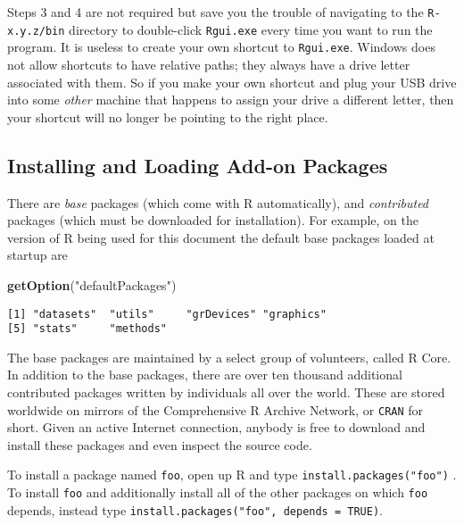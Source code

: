 \documentclass[]{book}
\newenvironment{Shaded}{\begin{snugshade}}{\end{snugshade}}
\newcommand{\KeywordTok}[1]{\textcolor[rgb]{0.13,0.29,0.53}{\textbf{{#1}}}}
\newcommand{\StringTok}[1]{\textcolor[rgb]{0.31,0.60,0.02}{{#1}}}
\newcommand{\NormalTok}[1]{{#1}}
\numberwithin{equation}{chapter}
\numberwithin{figure}{chapter}
\theoremstyle{plain}
\theoremstyle{definition}
\theoremstyle{remark}
\theoremstyle{definition}
\theoremstyle{definition}
\theoremstyle{remark}
\begin{document}
Steps 3 and 4 are not required but save you the trouble of navigating to
the \texttt{R-x.y.z/bin} directory to double-click \texttt{Rgui.exe}
every time you want to run the program. It is useless to create your own
shortcut to \texttt{Rgui.exe}. Windows does not allow shortcuts to have
relative paths; they always have a drive letter associated with them. So
if you make your own shortcut and plug your USB drive into some
\emph{other} machine that happens to assign your drive a different
letter, then your shortcut will no longer be pointing to the right
place.

\subsection{Installing and Loading Add-on
Packages}\label{sub-installing-loading-packages}

There are \emph{base} packages (which come with R automatically), and
\emph{contributed} packages (which must be downloaded for installation).
For example, on the version of R being used for this document the
default base packages loaded at startup are

\begin{Shaded}
\begin{Highlighting}[]
\KeywordTok{getOption}\NormalTok{(}\StringTok{"defaultPackages"}\NormalTok{)}
\end{Highlighting}
\end{Shaded}

\begin{verbatim}
[1] "datasets"  "utils"     "grDevices" "graphics" 
[5] "stats"     "methods"  
\end{verbatim}

The base packages are maintained by a select group of volunteers, called
R Core. In addition to the base packages, there are over ten thousand
additional contributed packages written by individuals all over the
world. These are stored worldwide on mirrors of the Comprehensive R
Archive Network, or \texttt{CRAN} for short. Given an active Internet
connection, anybody is free to download and install these packages and
even inspect the source code.

To install a package named \texttt{foo}, open up R and type
\texttt{install.packages("foo")}
. To install
\texttt{foo} and additionally install all of the other packages on which
\texttt{foo} depends, instead type
\texttt{install.packages("foo",\ depends\ =\ TRUE)}.
\end{document}
